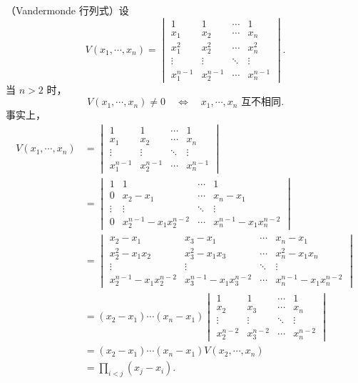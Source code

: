 \begin{example}
	（Vandermonde 行列式）设
	\[
	V(x_1,\cdots,x_n)=
	\begin{vmatrix}
		1&1&\cdots&1\\
		x_1&x_2&\cdots&x_n\\
		x_1^2&x_2^2&\cdots&x_n^2\\
		\vdots&\vdots&\ddots&\vdots\\
		x_1^{n-1}&x_2^{n-1}&\cdots&x_n^{n-1}
	\end{vmatrix}.
	\]当 $n>2$ 时，
	\[
	V(x_1,\cdots,x_n)\neq0
	\quad\Longleftrightarrow\quad
	x_1,\cdots,x_n\text{ 互不相同}.
	\]
	事实上，
	\[
	\begin{aligned}
		V(x_1,\cdots,x_n)
		&=
		\begin{vmatrix}
			1&1&\cdots&1\\
			x_1&x_2&\cdots&x_n\\
			\vdots&\vdots&\ddots&\vdots\\
			x_1^{n-1}&x_2^{n-1}&\cdots&x_n^{n-1}
		\end{vmatrix}\\
		&=
		\begin{vmatrix}
			1&1&\cdots&1\\
			0&x_2-x_1&\cdots&x_n-x_1\\
			\vdots&\vdots&\ddots&\vdots\\
			0&x_2^{n-1}-x_1x_2^{n-2}&\cdots&x_n^{n-1}-x_1x_n^{n-2}
		\end{vmatrix}\\
		&=
		\begin{vmatrix}
			x_2-x_1&x_3-x_1&\cdots&x_n-x_1\\
			x_2^2-x_1x_2&x_3^2-x_1x_3&\cdots&x_n^2-x_1x_n\\
			\vdots&\vdots&\ddots&\vdots\\
			x_2^{n-1}-x_1x_2^{n-2}&x_3^{n-1}-x_1x_3^{n-2}&\cdots&x_n^{n-1}-x_1x_n^{n-2}
		\end{vmatrix}\\
		&=(x_2-x_1)\cdots(x_n-x_1)
		\begin{vmatrix}
			1&1&\cdots&1\\
			x_2&x_3&\cdots&x_n\\
			\vdots&\vdots&\ddots&\vdots\\
			x_2^{n-2}&x_3^{n-2}&\cdots&x_n^{n-2}
		\end{vmatrix}\\
		&=(x_2-x_1)\cdots(x_n-x_1)V(x_2,\cdots,x_n)\\
		&=\prod_{i<j}(x_j-x_i).
	\end{aligned}
	\]
\end{example}


